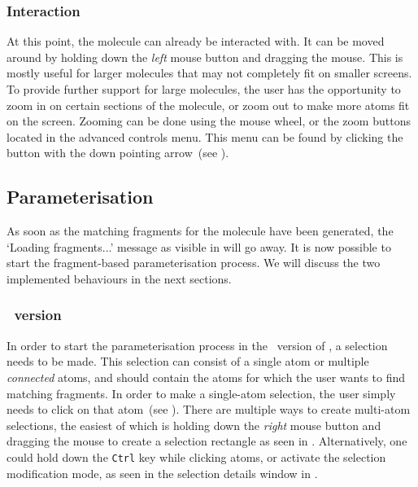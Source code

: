 \subsubsection{Interaction}
At this point, the molecule can already be interacted with. It can be moved around by holding down the \emph{left} mouse button and dragging the mouse. This is mostly useful for larger molecules that may not completely fit on smaller screens. To provide further support for large molecules, the user has the opportunity to zoom in on certain sections of the molecule, or zoom out to make more atoms fit on the screen. Zooming can be done using the mouse wheel, or the zoom buttons located in the advanced controls menu. This menu can be found by clicking the button with the down pointing arrow~(see ).


\subsection{Parameterisation}
As soon as the matching fragments for the molecule have been generated, the `Loading fragments...' message as visible in  will go away. It is now possible to start the fragment-based parameterisation process. We will discuss the two implemented behaviours in the next sections.

\subsubsection{\IDA\ version}
In order to start the parameterisation process in the \IDa\ version of \oframp, a selection needs to be made. This selection can consist of a single atom or multiple \emph{connected} atoms, and should contain the atoms for which the user wants to find matching fragments. In order to make a single-atom selection, the user simply needs to click on that atom~(see ). There are multiple ways to create multi-atom selections, the easiest of which is holding down the \emph{right} mouse button and dragging the mouse to create a selection rectangle as seen in . Alternatively, one could hold down the \verb|Ctrl| key while clicking atoms, or activate the selection modification mode, as seen in the selection details window in .

